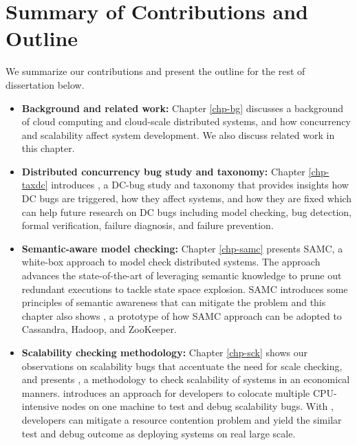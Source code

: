 \section{Summary of Contributions and Outline}

We summarize our contributions and present the outline for the rest of
dissertation below.

\begin{itemize}

\item \textbf{Background and related work:} Chapter \ref{chp-bg} discusses a
background of cloud computing and cloud-scale distributed systems, and how
concurrency and scalability affect system development. We also discuss related
work in this chapter.

\item \textbf{Distributed concurrency bug study and taxonomy:} Chapter
\ref{chp-taxdc} introduces \taxdc, a DC-bug study and taxonomy that provides
insights how DC bugs are triggered, how they affect systems, and how they are
fixed which can help future research on DC bugs including model checking, bug
detection, formal verification, failure diagnosis, and failure prevention.

\item \textbf{Semantic-aware model checking:} Chapter \ref{chp-samc} presents
SAMC, a white-box approach to model check distributed systems. The approach
advances the state-of-the-art of leveraging semantic knowledge to prune out
redundant executions to tackle state space explosion. SAMC introduces some
principles of semantic awareness that can mitigate the problem and this chapter
also shows \sampro, a prototype of how SAMC approach can be adopted to
Cassandra, Hadoop, and ZooKeeper.


\item \textbf{Scalability checking methodology:} Chapter \ref{chp-sck} shows our
observations on scalability bugs that accentuate the need for scale checking,
and presents \sck, a methodology to check scalability of systems in an
economical manners. \sck introduces an approach for developers to colocate
multiple CPU-intensive nodes on one machine to test and debug scalability bugs.
With \sck, developers can mitigate a resource contention problem and yield the
similar test and debug outcome as deploying systems on real large scale.


\end{itemize}
